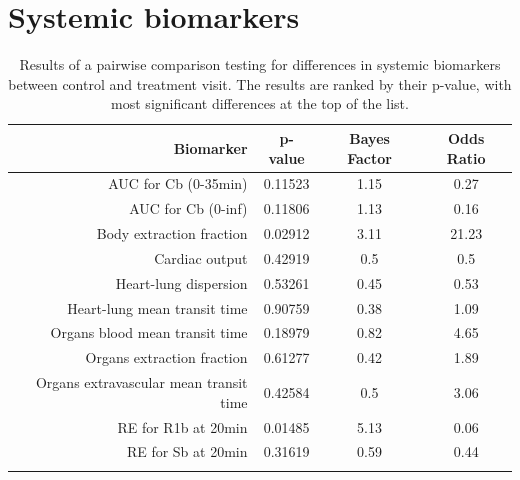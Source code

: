 \documentclass{epflreport}%
\begin{document}
\section{Systemic biomarkers}%
\label{sec:Systemicbiomarkers}%

%
\begin{longtable}{rccc}%
\hline%
Biomarker&p{-}value&Bayes Factor&Odds Ratio\\%
\hline%
AUC for Cb (0{-}35min)&0.11523&1.15&0.27\\%
AUC for Cb (0{-}inf)&0.11806&1.13&0.16\\%
Body extraction fraction&0.02912&3.11&21.23\\%
Cardiac output&0.42919&0.5&0.5\\%
Heart{-}lung dispersion&0.53261&0.45&0.53\\%
Heart{-}lung mean transit time&0.90759&0.38&1.09\\%
Organs blood mean transit time&0.18979&0.82&4.65\\%
Organs extraction fraction&0.61277&0.42&1.89\\%
Organs extravascular mean transit time&0.42584&0.5&3.06\\%
RE for R1b at 20min&0.01485&5.13&0.06\\%
RE for Sb at 20min&0.31619&0.59&0.44\\%
\hline%
\caption{Results of a pairwise comparison testing for differences in systemic biomarkers between control and treatment visit. The results are ranked by their p-value, with most significant differences at the top of the list.} \\%
\end{longtable}%
\end{document}
